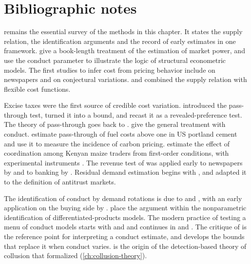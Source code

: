 \section{Bibliographic notes}\label{sec:03-notes}

\citet{Bresnahan1989} remains the essential survey of the methods in this chapter. It states the supply relation, the
identification arguments and the record of early estimates in one framework. \citet{PerloffKarpGolan2007} give a
book-length treatment of the estimation of market power, and \citet{ReissWolak2007} use the conduct parameter to
illustrate the logic of structural econometric models. The first studies to infer cost from pricing behavior include
\citet{Rosse1970} on newspapers and \citet{Iwata1974} on conjectural variations. \citet{GollopRoberts1979} and
\citet{Appelbaum1979,Appelbaum1982} combined the supply relation with flexible cost functions.

Excise taxes were the first source of credible cost variation. \citet{Sumner1981} introduced the pass-through test,
\citet{Sullivan1985} turned it into a bound, and \citet{AshenfelterSullivan1987} recast it as a revealed-preference
test. The theory of pass-through goes back to \citet{BulowPfleiderer1983}. \citet{WeylFabinger2013} give the general
treatment with conduct. \citet{MillerOsborneSheu2017} estimate pass-through of fuel costs above one in US portland cement
and use it to measure the incidence of carbon pricing.
\citet{BergquistDinerstein2020} estimate the effect of coordination among Kenyan maize traders from first-order
conditions, with experimental instruments \citep[p.~214, n.~86]{AskerNocke2021}. The revenue test of \citet{PanzarRosse1987} was applied early to newspapers by \citet{PanzarRosse1977} and to
banking by \citet{Shaffer1982}. Residual demand
estimation begins with \citet{BakerBresnahan1985,BakerBresnahan1988}, and \citet{ScheffmanSpiller1987} adapted it to the
definition of antitrust markets.

The identification of conduct by demand rotations is due to \citet{Bresnahan1982} and \citet{Lau1982}, with an early
application on the buying side by \citet{JustChern1980}. \citet{BerryHaile2014} place the argument within the
nonparametric identification of differentiated-products models. The modern practice of testing a menu of conduct models
starts with \citet{Bresnahan1987} and \citet{Nevo1998,Nevo2001} and continues in \citet{BackusConlonSinkinson2021} and
\citet{DuarteEtAl2024}. The critique of \citet{Corts1999} is the reference point for interpreting a conduct estimate, and
\citet{Rosen2007} develops the bounds that replace it when conduct varies. \citet{Stigler1964} is the origin of the
detection-based theory of collusion that \citet{GreenPorter1984} formalized (\cref{ch:collusion-theory}).

